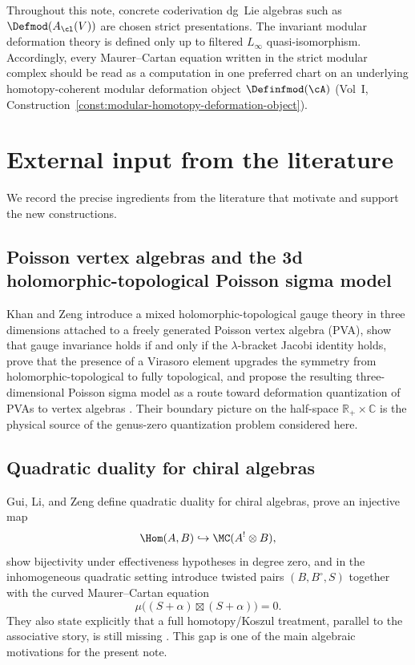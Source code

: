 \begin{convention}
\label{conv:modular-pva-strict-versus-homotopy}
Throughout this note, concrete coderivation dg~Lie algebras such as
$\Defmod(A_{\cl}(V))$ are chosen strict presentations.  The invariant
modular deformation theory is defined only up to filtered
$L_\infty$ quasi-isomorphism.  Accordingly, every Maurer--Cartan equation
written in the strict modular complex should be read as a computation in
one preferred chart on an underlying homotopy-coherent modular
deformation object $\Definfmod(\cA)$
(Vol~I, Construction~\ref*{const:modular-homotopy-deformation-object}).
\end{convention}

\section{External input from the literature}

We record the precise ingredients from the literature that motivate and support the
new constructions.

\subsection{Poisson vertex algebras and the 3d holomorphic-topological Poisson sigma model}

Khan and Zeng introduce a mixed holomorphic-topological gauge theory in three dimensions
attached to a freely generated Poisson vertex algebra (PVA), show that gauge invariance
holds if and only if the $\lambda$-bracket Jacobi identity holds, prove that the presence
of a Virasoro element upgrades the symmetry from holomorphic-topological to fully
topological, and propose the resulting three-dimensional Poisson sigma model as a route
toward deformation quantization of PVAs to vertex algebras \cite{KZ25}. Their
boundary picture on the half-space $\mathbb R_+\times \mathbb C$ is the physical source of
the genus-zero quantization problem considered here.

\subsection{Quadratic duality for chiral algebras}

Gui, Li, and Zeng define quadratic duality for chiral algebras, prove an injective map
\[
\Hom(A,B)\hookrightarrow \MC(A^!\otimes B),
\]
show bijectivity under effectiveness hypotheses in degree zero, and in the inhomogeneous
quadratic setting introduce twisted pairs $(B,B^\circ,S)$ together with the curved
Maurer--Cartan equation
\[
\mu\big((S+\alpha)\boxtimes (S+\alpha)\big)=0.
\]
They also state explicitly that a full homotopy/Koszul treatment, parallel to the
associative story, is still missing \cite{GLZ22}. This gap is one of the main
algebraic motivations for the present note.

